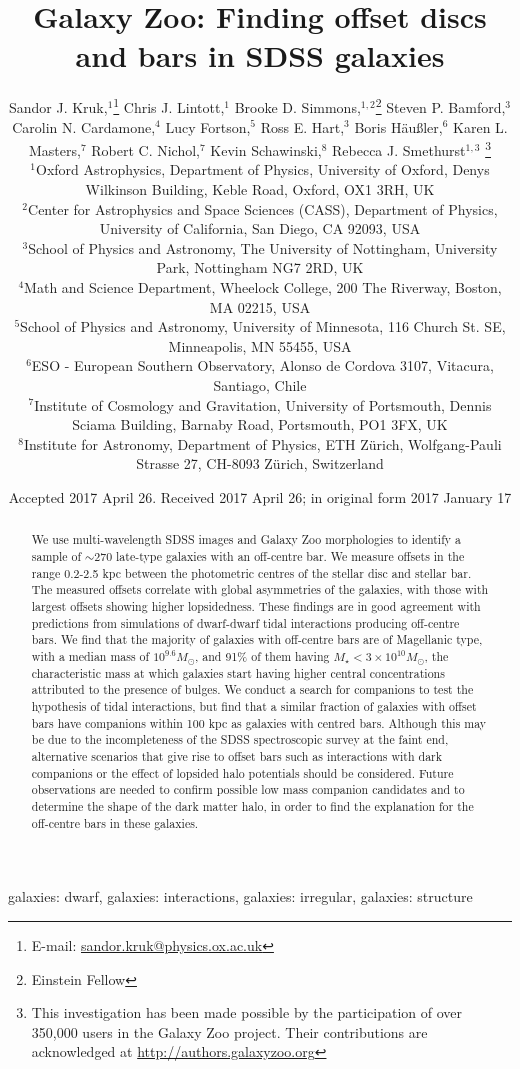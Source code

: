 \documentclass[a4paper,fleqn,usenatbib,useAMS]{mnras}
\title[GZ: Offset discs and bars in SDSS]{Galaxy Zoo: Finding offset discs and bars in SDSS galaxies}
\author[Sandor Kruk et al.]{
Sandor J. Kruk,$^{1}$\thanks{E-mail: \href{mailto:sandor.kruk@physics.ox.ac.uk}{sandor.kruk@physics.ox.ac.uk}}
Chris J. Lintott,$^{1}$ 
Brooke D. Simmons,$^{1,2}$\thanks{Einstein Fellow}
Steven P. Bamford,$^{3}$ 
\newauthor
Carolin N. Cardamone,$^{4}$ 
Lucy Fortson,$^{5}$ 
Ross E. Hart,$^{3}$ 
Boris H{\"a}u{\ss}ler,$^{6}$
\newauthor 
Karen L. Masters,$^{7}$
Robert C. Nichol,$^{7}$ 
Kevin Schawinski,$^{8}$
Rebecca J. Smethurst$^{1,3}$
\thanks{This investigation has been made possible by the participation of over 350,000 users in the Galaxy Zoo project. Their contributions are acknowledged at \href{http://authors.galaxyzoo.org}{http://authors.galaxyzoo.org}}\\
$^{1}$Oxford Astrophysics, Department of Physics, University of Oxford, Denys Wilkinson Building, Keble Road, Oxford, OX1 3RH, UK\\
$^{2}$Center for Astrophysics and Space Sciences (CASS), Department of Physics, University of California, San Diego, CA 92093, USA\\
$^{3}$School of Physics and Astronomy, The University of Nottingham, University Park, Nottingham NG7 2RD, UK\\
$^{4}$Math and Science Department, Wheelock College, 200 The Riverway, Boston, MA 02215, USA\\
$^{5}$School of Physics and Astronomy, University of Minnesota, 116 Church St. SE, Minneapolis, MN 55455, USA\\
$^{6}$ESO - European Southern Observatory, Alonso de Cordova 3107, Vitacura, Santiago, Chile\\
$^{7}$Institute of Cosmology and Gravitation, University of Portsmouth, Dennis Sciama Building, Barnaby Road, Portsmouth, PO1 3FX, UK\\
$^{8}$Institute for Astronomy, Department of Physics, ETH Z{\"u}rich, Wolfgang-Pauli Strasse 27, CH-8093 Z{\"u}rich, Switzerland}
\date{Accepted 2017 April 26. Received 2017 April 26; in original form 2017 January 17}
\begin{document}
\label{firstpage}
\pagerange{\pageref{firstpage}--\pageref{lastpage}}
\maketitle

\begin{abstract}
We use multi-wavelength SDSS images and Galaxy Zoo morphologies to identify a sample of $\sim$$270$ late-type galaxies with an off-centre bar. We measure offsets in the range 0.2-2.5 kpc between the photometric centres of the stellar disc and stellar bar. The measured offsets correlate with global asymmetries of the galaxies, with those with largest offsets showing higher lopsidedness. These findings are in good agreement with predictions from simulations of dwarf-dwarf tidal interactions producing off-centre bars. We find that the majority of galaxies with off-centre bars are of Magellanic type, with a median mass of $10^{9.6} M_{\odot}$, and 91\% of them having $M_{\star}<3\times10^{10} M_{\odot}$, the characteristic mass at which galaxies start having higher central concentrations attributed to the presence of bulges. We conduct a search for companions to test the hypothesis of tidal interactions, but find that a similar fraction of galaxies with offset bars have companions within 100 kpc as galaxies with centred bars. Although this may be due to the incompleteness of the SDSS spectroscopic survey at the faint end, alternative scenarios that give rise to offset bars such as interactions with dark companions or the effect of lopsided halo potentials should be considered. Future observations are needed to confirm possible low mass companion candidates and to determine the shape of the dark matter halo, in order to find the explanation for the off-centre bars in these galaxies.

\end{abstract}

\begin{keywords}
galaxies: dwarf, galaxies: interactions, galaxies: irregular, galaxies: structure
\end{keywords}



\end{document}
